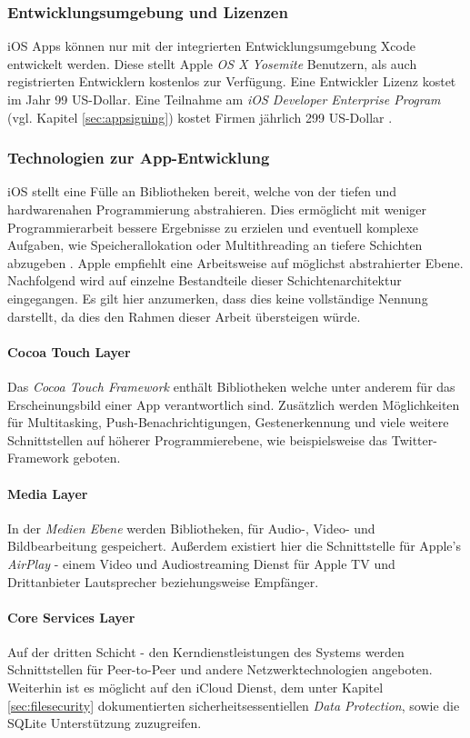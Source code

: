 	\subsubsection{Entwicklungsumgebung und Lizenzen}
		iOS Apps können nur mit der integrierten Entwicklungsumgebung Xcode
		entwickelt werden. Diese stellt Apple \textsl{OS X Yosemite}
		Benutzern, als auch registrierten Entwicklern kostenlos zur Verfügung.
		Eine Entwickler Lizenz kostet im Jahr 99 US-Dollar. Eine Teilnahme am
		\textsl{iOS Developer Enterprise Program} (vgl. Kapitel \ref{sec:appsigning})
		kostet Firmen jährlich 299 US-Dollar \cite{AppleDev2015}.
	\subsubsection{Technologien zur App-Entwicklung}
		iOS stellt eine Fülle an Bibliotheken bereit, welche von der
		tiefen und hardwarenahen Programmierung abstrahieren. Dies ermöglicht mit
		weniger Programmierarbeit bessere Ergebnisse zu erzielen und eventuell
		komplexe Aufgaben, wie Speicherallokation oder Multithreading an tiefere
		Schichten abzugeben \cite{AboutiOSTech2015}.
		Apple empfiehlt eine Arbeitsweise auf möglichst abstrahierter Ebene.
		Nachfolgend wird auf einzelne Bestandteile dieser Schichtenarchitektur
		eingegangen. Es gilt hier anzumerken, dass dies keine vollständige Nennung
		darstellt, da dies den Rahmen dieser Arbeit	übersteigen würde.
		\paragraph{Cocoa Touch Layer}
			Das \textsl{Cocoa Touch Framework} enthält Bibliotheken welche unter anderem
			für das Erscheinungsbild einer App verantwortlich sind. Zusätzlich werden
			Möglichkeiten für Multitasking, Push-Benachrichtigungen, Gestenerkennung und
			viele weitere Schnittstellen auf höherer Programmierebene, wie beispielsweise
			das Twitter-Framework geboten.
		\paragraph{Media Layer}
			In der \textsl{Medien Ebene} werden Bibliotheken, für
			Audio-, Video- und Bildbearbeitung gespeichert. Außerdem existiert hier die
			Schnittstelle für Apple's \textsl{AirPlay} - einem Video und Audiostreaming
			Dienst für Apple TV und Drittanbieter Lautsprecher beziehungsweise Empfänger.
		\paragraph{Core Services Layer}
			Auf der dritten Schicht - den Kerndienstleistungen des Systems werden
			Schnittstellen für Peer-to-Peer und andere Netzwerktechnologien angeboten.
			Weiterhin ist es möglicht auf den iCloud Dienst, dem unter Kapitel
			\ref{sec:filesecurity} dokumentierten sicherheitsessentiellen \textsl{Data
			Protection}, sowie die SQLite Unterstützung zuzugreifen.
